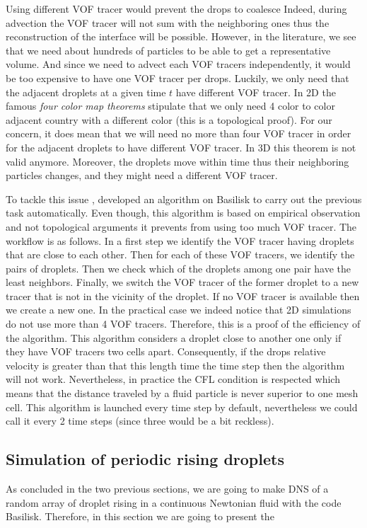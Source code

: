 Using different VOF tracer would prevent the drops to coalesce 
Indeed, during advection the VOF tracer will not sum with the neighboring ones thus the reconstruction of the interface will be possible. 
However, in the literature, we see that we need about hundreds of particles to be able to get a representative volume. 
And since we need to advect each VOF tracers independently, it would be too expensive to have one VOF tracer per drops.    
Luckily, we only need that the adjacent droplets at a given time $t$ have different VOF tracer. 
In 2D the famous \textit{four color map theorems} stipulate that we only need 4 color to color adjacent country with a different color (this is a topological proof).
For our concern, it does mean that we will need no more than four VOF tracer in order for the adjacent droplets to have different VOF tracer. 
In 3D this theorem is not valid anymore. 
Moreover, the droplets move within time thus their neighboring particles changes, and they might need a different VOF tracer.

To tackle this issue \citet{mani2021numerical}, developed an algorithm on Basilisk to carry out the previous task automatically. 
Even though, this algorithm is based on empirical observation and not topological arguments it prevents from using too much VOF tracer. 
The workflow is as follows.
In a first step we identify the VOF tracer having droplets that are close to each other. 
Then for each of these VOF tracers, we identify the pairs of droplets. 
Then we check which of the droplets among one pair have the least neighbors. 
Finally, we switch the VOF tracer of the former droplet to a new tracer that is not in the vicinity of the droplet. 
If no VOF tracer is available then we create a new one. 
In the practical case we indeed notice that 2D simulations do not use more than 4 VOF tracers. 
Therefore, this is a proof of the efficiency of the algorithm. 
This algorithm considers a droplet close to another one only if they have VOF tracers two cells apart.
Consequently, if the drops relative velocity is greater than that this length time the time step then the algorithm will not work.
Nevertheless, in practice the CFL condition is respected which means that the distance traveled by a fluid particle is never superior to one mesh cell. 
This algorithm is launched every time step by default, nevertheless we could call it every 2 time steps (since three would be a bit reckless). 


\subsection{Simulation of periodic rising droplets}
As concluded in the two previous sections, we are going to make DNS of a random array of droplet rising in a continuous Newtonian fluid with the code Basilisk. 
Therefore, in this section we are going to present the 


